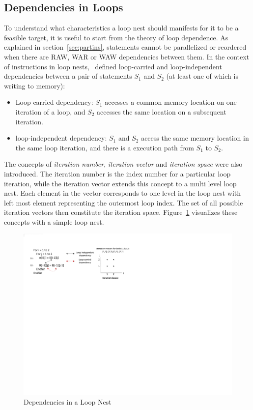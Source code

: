 \subsection{Dependencies in Loops}
To understand what characteristics a loop nest should manifests for it to be a feasible target, it is useful to start from the theory of loop dependence. As
explained in section~\ref{sec:partins}, statements cannot be parallelized or
reordered when there are RAW, WAR or WAW dependencies between them. In the context of instructions in loop nests,~\cite{Kennedy:2001:OCM:502981} defined
loop-carried and loop-independent dependencies between a pair of statements $S_1$ and $S_2$ (at least one of which is writing to memory):
\begin{itemize}
    \item Loop-carried dependency: $S_1$ accesses a common memory location 
    on one iteration of a loop, and $S_2$ accesses the same location on a subsequent iteration. 
    \item loop-independent dependency: $S_1$ and $S_2$ access the same memory location in the same loop iteration, and there is a execution path from $S_1$ to $S_2$. 
\end{itemize}
The concepts of \textit{iteration number}, \textit{iteration vector} and \textit{iteration space} were also introduced. The iteration number is the 
index number for a particular loop iteration, while the iteration vector
extends this concept to a multi level loop nest. Each element in the vector
corresponds to one level in the loop nest with left most element representing the outermost loop index. The set of all possible iteration vectors then
constitute the iteration space. Figure~\ref{fig:inivis} visualizes these concepts with a simple loop nest. 

\begin{figure}[htp]
\begin{center}
\includegraphics[width=0.9\linewidth]{chap6fig/iterationSp.pdf}
\caption{Dependencies in a Loop Nest
\label{fig:inivis}}
\end{center}
\end{figure}

